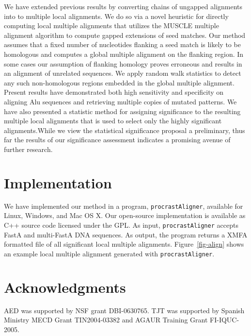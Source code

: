 \documentclass[twoside,11pt]{article}
\begin{document}
We have extended previous results by converting chains of ungapped alignments into to multiple local alignments. We do so via a novel heuristic for directly computing local multiple alignments that utilizes the MUSCLE multiple alignment algorithm to compute gapped extensions of seed matches.  Our method assumes that a fixed number of nucleotides flanking a seed match is likely to be homologous and computes a global multiple alignment on the flanking region.  In some cases our assumption of flanking homology proves erroneous and results in an alignment of unrelated sequences.  We apply random walk statistics to detect any such non-homologous regions embedded in the global multiple alignment.
Present results have demonstrated both high sensitivity and specificity on aligning Alu
sequences and retrieving multiple copies of mutated patterns. We have also presented a statistic method for assigning significance to the resulting multiple local alignments that is used to select only the highly significant alignments.While we view the statistical significance proposal a preliminary, thus far the results of our significance assessment indicates a promising avenue of further research.

\section{Implementation}
We have implemented our method in a program, \texttt{procrastAligner}, available for Linux, Windows, and Mac OS X. Our open-source implementation is available as C++ source code licensed under the GPL. As input, \texttt{procrastAligner} accepts FastA and multi-FastA DNA sequences. As output, the program returns a XMFA formatted file of all significant local multiple alignments. Figure~\ref{fig-align} shows an example local multiple alignment generated with \texttt{procrastAligner}.

\section{ Acknowledgments }
AED was supported by NSF grant DBI-0630765. TJT was
supported by Spanish Ministry MECD Grant TIN2004-03382 and AGAUR
Training Grant FI-IQUC-2005.

\small

\end{document}
